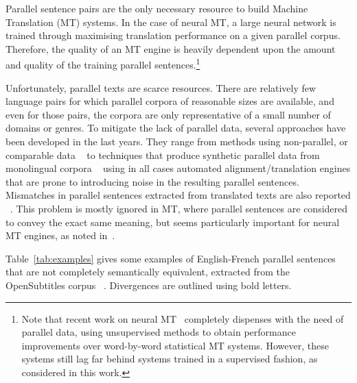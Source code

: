 \documentclass[11pt,a4paper]{article}
\begin{document}
Parallel sentence pairs are the only necessary resource to build Machine Translation (MT) systems.
In the case of neural MT, a large neural network is trained through maximising translation performance on a given parallel corpus. 
Therefore, the quality of an MT engine is heavily dependent upon the amount and quality of the training parallel sentences.\footnote{Note that  recent work on neural MT~\cite{lample2018word,artetxe2018iclr} completely dispenses with the need of parallel data, using unsupervised methods to obtain performance improvements over word-by-word statistical MT systems. However, these systems still lag far behind systems trained in a supervised fashion, as considered in this work.} 

Unfortunately, parallel texts are scarce resources. 
There are relatively few language pairs for which parallel corpora of
reasonable sizes are available, and even for those pairs, the corpora
are only representative of a small number of domains or genres. 
To mitigate the lack of parallel data, several approaches have been developed in the last years.
They range from methods using non-parallel, or comparable data ~\cite{Zhao:2002:APS:844380.844785,W04-3208,J05-4003,W17-2509,P17-3003,P18-2037} to techniques that produce synthetic parallel data from monolingual corpora ~\cite{P16-1009,W17-4714} using in all cases automated alignment/translation engines that are prone to introducing noise in the resulting parallel sentences. 
Mismatches in parallel sentences extracted from translated texts are also reported ~\cite{tiedemann2011bitext,XU16.310}. 
This problem is mostly ignored in MT, where parallel sentences are considered to convey the exact same meaning, but seems particularly important for neural MT engines, as noted in~\citet{chen2016adaptation}.

Table~\ref{tab:examples} gives some examples of English-French
parallel sentences that are not completely semantically equivalent, 
extracted from the OpenSubtitles corpus ~\cite{LisonTiedemann2016}. 
Divergences are outlined using bold letters. 
\end{document}
